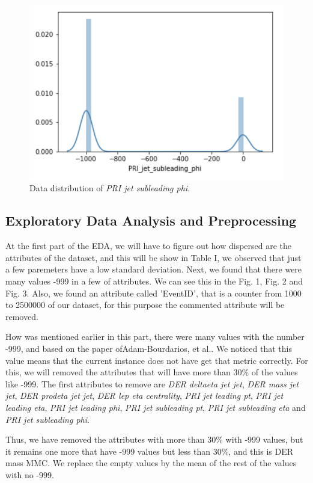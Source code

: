 \documentclass[conference]{IEEEtran}
\begin{document}
\begin{figure}[htbp]
\centerline{\includegraphics[width=\linewidth]{img3.png}}
\caption{Data distribution of \textit{PRI jet subleading phi}.}
\label{fig}
\end{figure}
\subsection{Exploratory Data Analysis and Preprocessing}\label{AA}
At the first part of the EDA, we will have to figure out how dispersed are the attributes of the dataset, and this will be show in Table I, we observed that just a few paremeters have a low standard deviation. Next, we found that there were many values -999 in a few of attributes. We can see this in the Fig. 1, Fig. 2 and Fig. 3. Also, we found an attribute called 'EventID', that is a counter from 1000 to 2500000 of our dataset, for this purpose the commented attribute will be removed.

How was mentioned earlier in this part, there were many values with the number -999, and based on the paper ofAdam-Bourdarios, et al.\cite{b1}. We noticed that this value means that the current instance does not have get that metric correctly. For this, we will removed the attributes that will have more than 30\% of the values like -999. The first attributes to remove are \textit{DER deltaeta jet jet}, \textit{DER mass jet jet}, \textit{DER prodeta jet jet}, \textit{DER lep eta centrality}, \textit{PRI jet leading pt}, \textit{PRI jet leading eta}, \textit{PRI jet leading phi}, \textit{PRI jet subleading pt}, \textit{PRI jet subleading eta} and \textit{PRI jet subleading phi}.

Thus, we have removed the attributes with more than 30\% with -999 values, but it remains one more that have -999 values but less than 30\%, and this is DER mass MMC. We replace the empty values by the mean of the rest of the values with no -999.
\end{document}
